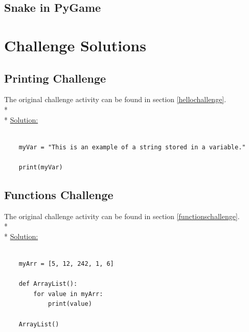\documentclass[12pt, letterpaper]{article}
\begin{document}
    \subsection{Snake in PyGame} \label{snake}
    
    \section{Challenge Solutions} \label{solutions}

    \subsection{Printing Challenge} \label{hellosol}
    The original challenge activity can be found in section \ref{hellochallenge}. \\*\\*
    \underline{Solution:}

    \begin{verbatim}
    
    myVar = "This is an example of a string stored in a variable."

    print(myVar)

    \end{verbatim}

    \subsection{Functions Challenge} \label{functionsol}

    The original challenge activity can be found in section \ref{functionschallenge}. \\* \\*
    \underline{Solution:}

    \begin{verbatim}

    myArr = [5, 12, 242, 1, 6]

    def ArrayList():
        for value in myArr:
            print(value)
    
    ArrayList()
    
    \end{verbatim}
\end{document}
